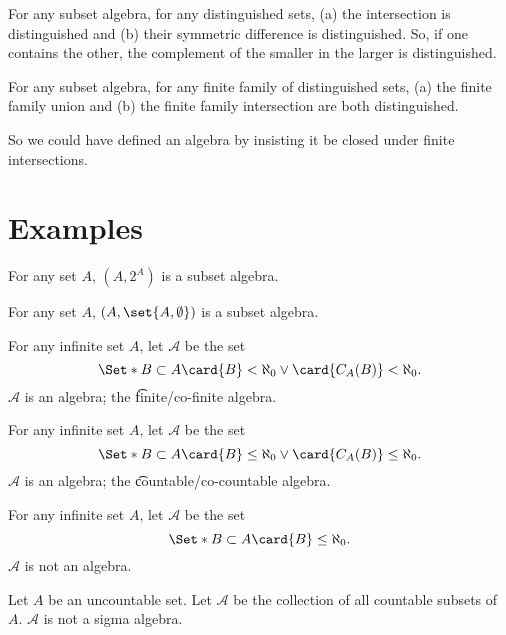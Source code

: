 \begin{proposition}
For any subset algebra,
for any distinguished sets,
(a) the intersection is distinguished and
(b) their symmetric difference is distinguished.
So, if one contains the other, the complement
of the smaller in the larger is distinguished.
\end{proposition}

\begin{proposition}
For any subset algebra,
for any finite family of distinguished sets,
(a) the finite family union and
(b) the finite family intersection
are both distinguished.
\end{proposition}

So we could have defined an algebra
by insisting it be closed under finite
intersections.

\section*{Examples}

\begin{example}
For any set $A$, $(A, 2^{A})$ is a subset algebra.
\end{example}

\begin{example}
For any set $A$, $(A, \set{A, \emptyset})$ is a subset algebra.
\end{example}

\begin{example}
For any infinite set $A$, let $\mathcal{A} $ be the set
\[
\Set*{
B \subset A
}{
\card{B} < \aleph_0 \lor
\card{C_{A}(B)} < \aleph_0
}.
\]
$\mathcal{A} $ is an algebra;
the
\t{finite/co-finite algebra}.
\end{example}

\begin{example}
For any infinite set $A$, let $\mathcal{A} $ be the set
\[
\Set*{
B \subset A
}{
\card{B} \leq \aleph_0 \lor
\card{C_{A}(B)} \leq \aleph_0
}.
\]
$\mathcal{A} $ is an algebra; the \t{countable/co-countable algebra}.
\end{example}

\begin{example}
For any infinite set $A$, let $\mathcal{A} $ be the set
\[
\Set*{
B \subset A
}{
\card{B} \leq \aleph_0
}.
\]
$\mathcal{A} $ is not an algebra.
\end{example}

\begin{example}
Let $A$ be an uncountable set.
Let $\mathcal{A} $ be the collection of all countable subsets of $A$.
$\mathcal{A} $ is not a sigma algebra.
\end{example}
